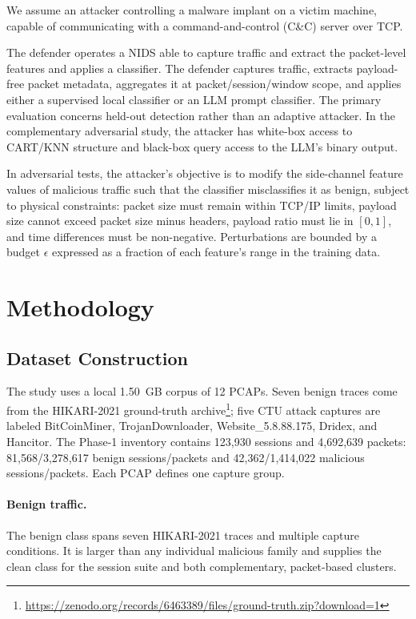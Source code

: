 \documentclass[letterpaper,twocolumn,10pt]{article}
\begin{document}
We assume an attacker controlling a malware implant on a victim machine, capable of communicating with a command-and-control (C\&C) server over TCP. 

The defender operates a NIDS able to capture traffic and extract the packet-level features and applies a classifier. The defender captures traffic, extracts payload-free packet metadata, aggregates it at packet/session/window scope, and applies either a supervised local classifier or an LLM prompt classifier. The primary evaluation concerns held-out detection rather than an adaptive attacker. In the complementary adversarial study, the attacker has white-box access to CART/KNN structure and black-box query access to the LLM's binary output.

In adversarial tests, the attacker's objective is to modify the side-channel feature values of malicious traffic such that the classifier misclassifies it as benign, subject to physical constraints: packet size must remain within TCP/IP limits, payload size cannot exceed packet size minus headers, payload ratio must lie in $[0, 1]$, and time differences must be non-negative. Perturbations are bounded by a budget $\epsilon$ expressed as a fraction of each feature's range in the training data.



\section{Methodology}
\label{sec:methodology}

\subsection{Dataset Construction}

The study uses a local 1.50~GB corpus of 12 PCAPs. Seven benign traces come from the HIKARI-2021 ground-truth archive\footnote{\url{https://zenodo.org/records/6463389/files/ground-truth.zip?download=1}}; five CTU attack captures are labeled BitCoinMiner, TrojanDownloader, Website\_5.8.88.175, Dridex, and Hancitor. The Phase-1 inventory contains 123{,}930 sessions and 4{,}692{,}639 packets: 81{,}568/3{,}278{,}617 benign sessions/packets and 42{,}362/1{,}414{,}022 malicious sessions/packets. Each PCAP defines one capture group.

\paragraph{Benign traffic.}
The benign class spans seven HIKARI-2021 traces and multiple capture conditions. It is larger than any individual malicious family and supplies the clean class for the session suite and both complementary, packet-based clusters.
\end{document}
